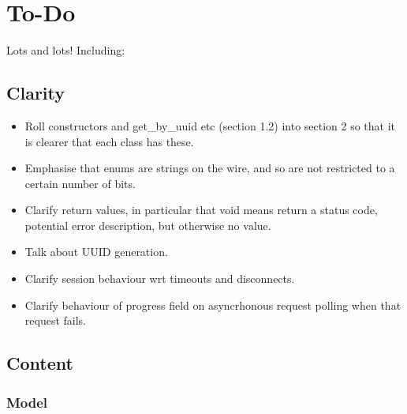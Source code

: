 %
%
%
%

\section{To-Do}

Lots and lots! Including:

\subsection{Clarity}

\begin{itemize}

\item Roll constructors and get\_by\_uuid etc (section 1.2) into section 2 so
that it is clearer that each class has these.

\item Emphasise that enums are strings on the wire, and so are not restricted
to a certain number of bits.

\item Clarify return values, in particular that void means return a status
code, potential error description, but otherwise no value.

\item Talk about UUID generation.

\item Clarify session behaviour wrt timeouts and disconnects.

\item Clarify behaviour of progress field on asyncrhonous request polling when
that request fails.

\end{itemize}

\subsection{Content}

\subsubsection{Model}


